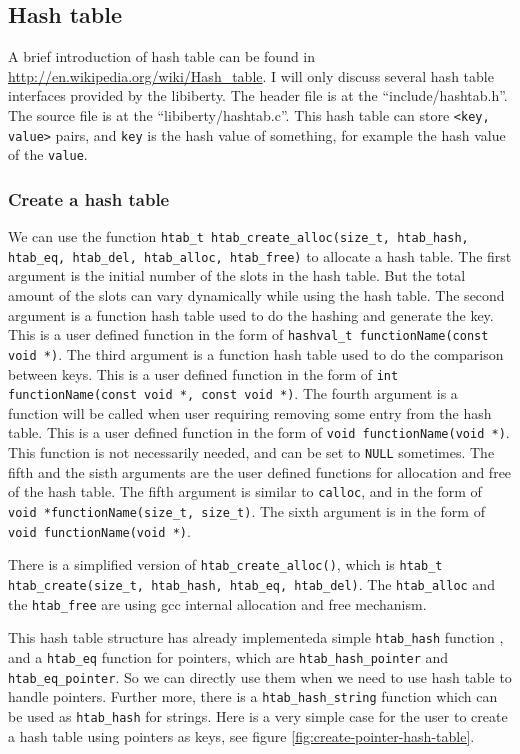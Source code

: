 \documentclass[11pt]{article}
\begin{document}
\subsection{Hash table}
A brief introduction of hash table can be found in \url{http://en.wikipedia.org/wiki/Hash_table}. I will only discuss several hash table interfaces provided by the libiberty. The header file is at the ``include/hashtab.h''. The source file is at the ``libiberty/hashtab.c''. This hash table can store \texttt{<key, value>} pairs, and \texttt{key} is the hash value of something, for example the hash value of the \texttt{value}.

\subsubsection{Create a hash table}
We can use the function \texttt{htab\_t htab\_create\_alloc(size\_t, htab\_hash, htab\_eq, htab\_del, htab\_alloc, htab\_free)} to allocate a hash table.
The first argument is the initial number of the slots in the hash table. But the total amount of the slots can vary dynamically while using the hash table.
The second argument is a function hash table used to do the hashing and generate the key. This is a user defined function in the form of \texttt{hashval\_t functionName(const void *)}.
The third argument is a function hash table used to do the comparison between keys. This is a user defined function in the form of \texttt{int functionName(const void *, const void *)}.
The fourth argument is a function will be called when user requiring removing some entry from the hash table. This is a user defined function in the form of \texttt{void functionName(void *)}. This function is not necessarily needed, and can be set to \texttt{NULL} sometimes.
The fifth and the sisth arguments are the user defined functions for allocation and free of the hash table. The fifth argument is similar to \texttt{calloc}, and in the form of \texttt{void *functionName(size\_t, size\_t)}. The sixth argument is in the form of \texttt{void functionName(void *)}.

There is a simplified version of \texttt{htab\_create\_alloc()}, which is \texttt{htab\_t htab\_create(size\_t, htab\_hash, htab\_eq, htab\_del)}. The \texttt{htab\_alloc} and the \texttt{htab\_free} are using gcc internal allocation and free mechanism.

This hash table structure has already implementeda simple \texttt{htab\_hash} function , and a \texttt{htab\_eq} function for pointers, which are \texttt{htab\_hash\_pointer} and \texttt{htab\_eq\_pointer}. So we can directly use them when we need to use hash table to handle pointers. Further more, there is a \texttt{htab\_hash\_string} function which can be used as \texttt{htab\_hash} for strings. Here is a very simple case for the user to create a hash table using pointers as keys, see figure \ref{fig:create-pointer-hash-table}.
\end{document}
